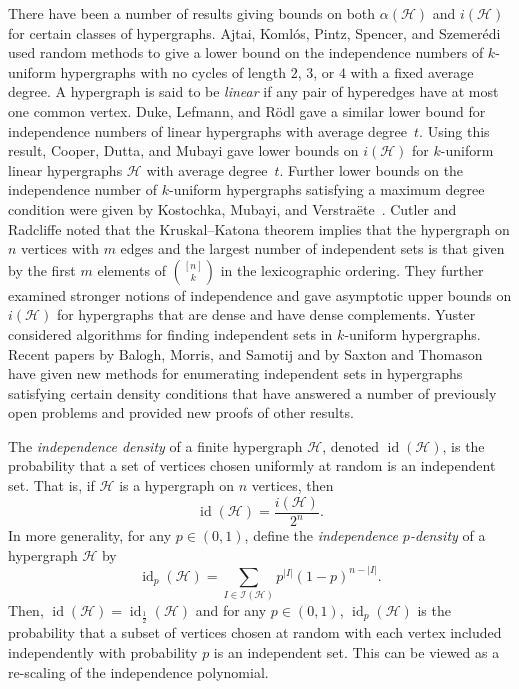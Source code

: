 \documentclass[11pt,reqno]{amsart}
\theoremstyle{definition}
\begin{document}
There have been a number of results giving bounds on both $\alpha(\mathcal{H})$ and $i(\mathcal{H})$ for certain classes of hypergraphs. Ajtai, Koml\'os, Pintz, Spencer, and Szemer\'edi \cite{AKPSS82} used random methods to give a lower bound on the independence numbers of $k$-uniform hypergraphs with no cycles of length $2$, $3$, or $4$ with a fixed average degree. A hypergraph is said to be \emph{linear} if any pair of hyperedges have at most one common vertex. Duke, Lefmann, and R\"odl \cite{DLR95} gave a similar lower bound for independence numbers of linear hypergraphs with average degree~$t$. Using this result, Cooper, Dutta, and Mubayi \cite{CDM14} gave lower bounds on $i(\mathcal{H})$ for $k$-uniform linear hypergraphs $\mathcal{H}$ with average degree~$t$. Further lower bounds on the independence number of $k$-uniform hypergraphs satisfying a maximum degree condition were given by Kostochka, Mubayi, and Verstra\"ete~\cite{KMV14}. Cutler and Radcliffe \cite{CR13} noted that the Kruskal--Katona theorem implies that the hypergraph on $n$ vertices with $m$ edges and the largest number of independent sets is that given by the first $m$ elements of $\binom{[n]}{k}$ in the lexicographic ordering. They further examined stronger notions of independence and gave asymptotic upper bounds on $i(\mathcal{H})$ for hypergraphs that are dense and have dense complements. Yuster \cite{rY06} considered algorithms for finding independent sets in $k$-uniform hypergraphs. Recent papers by Balogh, Morris, and Samotij \cite{BMS14} and by Saxton and Thomason \cite{ST14} have given new methods for enumerating independent sets in hypergraphs satisfying certain density conditions that have answered a number of previously open problems and provided new proofs of other results.

The \emph{independence density} of a finite hypergraph $\mathcal{H}$, denoted ${\operatorname{id}}(\mathcal{H})$, is the probability that a set of vertices chosen uniformly at random is an independent set.  That is, if $\mathcal{H}$ is a hypergraph on $n$ vertices, then
\begin{equation}\label{eq:def-id}
 {\operatorname{id}}(\mathcal{H}) = \frac{i(\mathcal{H})}{2^n}.
\end{equation}
In more generality, for any $p \in (0,1)$, define the \emph{independence $p$-density} of a hypergraph $\mathcal{H}$ by
\begin{equation}\label{eq:def-idp}
{\operatorname{id}}_p(\mathcal{H}) = \sum_{I \in \mathcal{I}(\mathcal{H})} p^{|I|}(1-p)^{n - |I|}.
\end{equation}
Then, ${\operatorname{id}}(\mathcal{H})= {\operatorname{id}}_{\frac{1}{2}}(\mathcal{H})$ and for any $p \in (0,1)$, ${\operatorname{id}}_p(\mathcal{H})$ is the probability that a subset of vertices chosen at random with each vertex included independently with probability $p$ is an independent set.  This can be viewed as a re-scaling of the independence polynomial.
\end{document}
